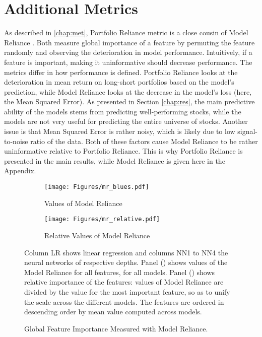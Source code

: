 \chapter{Additional Metrics}
\label{chap:additional_metrics} 

As described in \ref{chap:met}, Portfolio Reliance metric is a close cousin of Model Reliance \cite{fisher2019all}. Both measure global importance of a feature by permuting the feature randomly and observing the deterioration in model performance. Intuitively, if a feature is important, making it uninformative should decrease performance. The metrics differ in how performance is defined. Portfolio Reliance looks at the deterioration in mean return on long-short portfolios based on the model's prediction, while Model Reliance looks at the decrease in the model's loss (here, the Mean Squared Error). As presented in Section \ref{chap:res}, the main predictive ability of the models stems from predicting well-performing stocks, while the models are not very useful for predicting the entire universe of stocks. Another issue is that Mean Squared Error is rather noisy, which is likely due to low signal-to-noise ratio of the data. Both of these factors cause Model Reliance to be rather uninformative relative to Portfolio Reliance. This is why Portfolio Reliance is presented in the main results, while Model Reliance is given here in the Appendix. 

\begin{figure}	
	\centering		
	\begin{subfigure}[t]{\textwidth}
		\texttt{[image: Figures/mr\_blues.pdf]}
		\caption{Values of Model Reliance}
		\label{fig:mr_blues}
	\end{subfigure}
	
	\begin{subfigure}[t]{\textwidth}
		\centering
		\texttt{[image: Figures/mr\_relative.pdf]}
		\caption{Relative Values of Model Reliance}
		\label{fig:mr_relative}
	\end{subfigure}
	\caption{Global Feature Importance Measured with Model Reliance.}
	\medskip
	\small
	Column LR shows linear regression and columns NN1 to NN4 the neural networks of respective depths. Panel () shows values of the Model Reliance for all features, for all models.  Panel () shows relative importance of the features: values of Model Reliance are divided by the value for the most important feature, so as to unify the scale across the different models. The features are ordered in descending order by mean value computed across models.
	\label{fig:mr_ensemble}
\end{figure}

